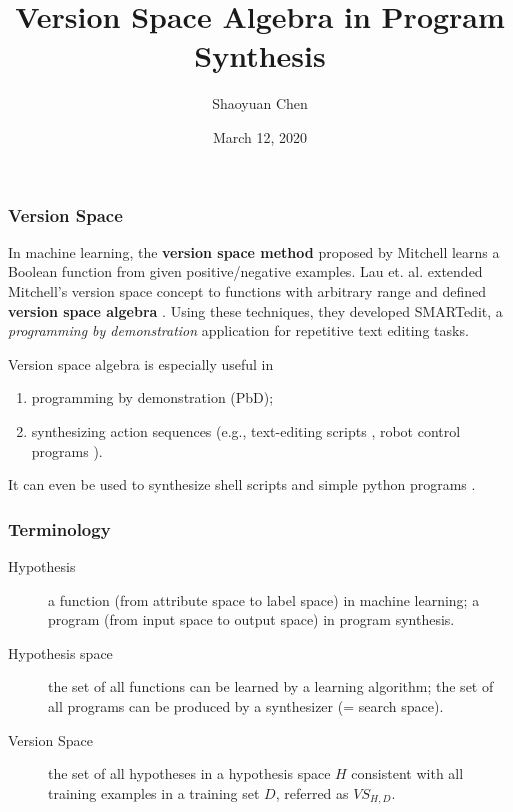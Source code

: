 \documentclass[]{beamer}
\title[VSA in Program Synthesis]{Version Space Algebra in Program Synthesis}
\institute[SPAR PL4SE]{SPAR PL4SE, Institute of Computer Software, Nanjing University}
\author{Shaoyuan Chen}
\date{March 12, 2020}
\begin{document}
\begin{frame}
	\titlepage
\end{frame}


\begin{frame}
	\frametitle{Version Space}
	In machine learning, the \textbf{version space method} proposed by Mitchell \cite{mitchell} learns a Boolean function from given positive/negative examples. Lau et. al. extended Mitchell's version space concept to functions with arbitrary range and defined \textbf{version space algebra} \cite{lau}. Using these techniques, they developed SMARTedit, a \textit{programming by demonstration} application for repetitive text editing tasks.
	
	\pause
	
	Version space algebra is especially useful in
	\begin{enumerate}
		\item programming by demonstration (PbD);
		\item synthesizing action sequences (e.g., text-editing scripts \cite{mitchell}, robot control programs \cite{pardowitz}).
	\end{enumerate}
	It can even be used to synthesize shell scripts \cite{shell} and simple python programs \cite{python}.
\end{frame}

\begin{frame}
\frametitle{Terminology}
\begin{description}
	\item[Hypothesis] a function (from attribute space to label space) in machine learning; a program (from input space to output space) in program synthesis. 
	\item[Hypothesis space] the set of all functions can be learned by a learning algorithm; the set of all programs can be produced by a synthesizer (= search space).
	\item[Version Space] the set of all hypotheses in a hypothesis space $H$ consistent with all training examples in a training set $D$, referred as $VS_{H, D}$. 
\end{description}
\end{frame}
\end{document}
